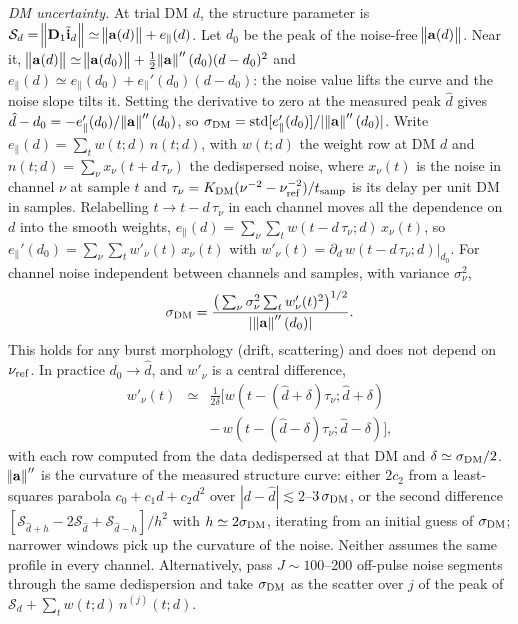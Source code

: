 \documentclass[twocolumn]{aastex631}
\begin{document}
\textit{DM uncertainty.} At trial DM $d$, the structure parameter is $\mathcal{S}_d=\norm{\mathbf{D}_1\tilde{\mathbf{i}}_d}\simeq\norm{\mathbf{a}(d)}+e_\parallel(d)$. Let $d_0$ be the peak of the noise-free $\norm{\mathbf{a}(d)}$. Near it, $\norm{\mathbf{a}(d)}\simeq\norm{\mathbf{a}(d_0)}+\tfrac12\norm{\mathbf{a}}''(d_0)(d-d_0)^2$ and $e_\parallel(d)\simeq e_\parallel(d_0)+e_\parallel'(d_0)(d-d_0)$: the noise value lifts the curve and the noise slope tilts it. Setting the derivative to zero at the measured peak $\hat d$ gives $\hat d-d_0=-e_\parallel'(d_0)/\norm{\mathbf{a}}''(d_0)$, so $\sigma_{\rm DM}={\rm std}[e_\parallel'(d_0)]/|\norm{\mathbf{a}}''(d_0)|$. Write $e_\parallel(d)=\sum_tw(t;d)\,n(t;d)$, with $w(t;d)$ the weight row at DM $d$ and $n(t;d)=\sum_{\nu}x_{\nu}(t+d\,\tau_{\nu})$ the dedispersed noise, where $x_{\nu}(t)$ is the noise in channel $\nu$ at sample $t$ and $\tau_{\nu}=K_{\rm DM}(\nu^{-2}-\nu_{\rm ref}^{-2})/t_{\rm samp}$ is its delay per unit DM in samples. Relabelling $t\to t-d\,\tau_{\nu}$ in each channel moves all the dependence on $d$ into the smooth weights, $e_\parallel(d)=\sum_{\nu}\sum_tw(t-d\,\tau_{\nu};d)\,x_{\nu}(t)$, so $e_\parallel'(d_0)=\sum_{\nu}\sum_tw'_{\nu}(t)\,x_{\nu}(t)$ with $w'_{\nu}(t)=\partial_d\,w(t-d\,\tau_{\nu};d)|_{d_0}$. For channel noise independent between channels and samples, with variance $\sigma_{\nu}^2$,
\begin{eqnarray}
\sigma_{\rm DM}=\frac{\big(\sum_{\nu}\sigma_{\nu}^2\sum_tw'_{\nu}(t)^2\big)^{1/2}}{|\norm{\mathbf{a}}''(d_0)|}.
\label{eqn:sigma_DM}
\end{eqnarray}
This holds for any burst morphology (drift, scattering) and does not depend on $\nu_{\rm ref}$. In practice $d_0\to\hat d$, and $w'_{\nu}$ is a central difference,
\begin{eqnarray}
w'_{\nu}(t)&\simeq&\frac{1}{2\delta}\big[w(t-(\hat d+\delta)\tau_{\nu};\hat d+\delta)\nonumber\\
&&-\,w(t-(\hat d-\delta)\tau_{\nu};\hat d-\delta)\big],\nonumber
\end{eqnarray}
with each row computed from the data dedispersed at that DM and $\delta\simeq\sigma_{\rm DM}/2$. $\norm{\mathbf{a}}''$ is the curvature of the measured structure curve: either $2c_2$ from a least-squares parabola $c_0+c_1d+c_2d^2$ over $|d-\hat d|\lesssim2$--$3\,\sigma_{\rm DM}$, or the second difference $[\mathcal{S}_{\hat d+h}-2\mathcal{S}_{\hat d}+\mathcal{S}_{\hat d-h}]/h^2$ with $h\simeq2\sigma_{\rm DM}$, iterating from an initial guess of $\sigma_{\rm DM}$; narrower windows pick up the curvature of the noise. Neither assumes the same profile in every channel. Alternatively, pass $J\sim100$--200 off-pulse noise segments through the same dedispersion and take $\sigma_{\rm DM}$ as the scatter over $j$ of the peak of $\mathcal{S}_d+\sum_tw(t;d)\,n^{(j)}(t;d)$.
\end{document}
